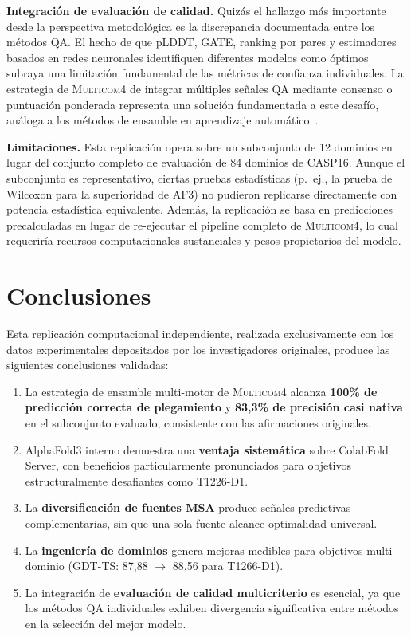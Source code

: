 \documentclass[10pt,twocolumn,a4paper]{article}
\newcommand{\gdtts}{\textsc{GDT-TS}}
\newcommand{\afthree}{AlphaFold3}
\newcommand{\multicom}{\textsc{Multicom4}}
\begin{document}
\textbf{Integración de evaluación de calidad.} Quizás el hallazgo más importante desde la perspectiva metodológica es la discrepancia documentada entre los métodos QA. El hecho de que pLDDT, GATE, ranking por pares y estimadores basados en redes neuronales identifiquen diferentes modelos como óptimos subraya una limitación fundamental de las métricas de confianza individuales. La estrategia de \multicom{} de integrar múltiples señales QA mediante consenso o puntuación ponderada representa una solución fundamentada a este desafío, análoga a los métodos de ensamble en aprendizaje automático~\cite{dietterich2000ensemble}.

\textbf{Limitaciones.} Esta replicación opera sobre un subconjunto de 12 dominios en lugar del conjunto completo de evaluación de 84 dominios de CASP16. Aunque el subconjunto es representativo, ciertas pruebas estadísticas (p.~ej., la prueba de Wilcoxon para la superioridad de AF3) no pudieron replicarse directamente con potencia estadística equivalente. Además, la replicación se basa en predicciones precalculadas en lugar de re-ejecutar el pipeline completo de \multicom{}, lo cual requeriría recursos computacionales sustanciales y pesos propietarios del modelo.


\section{Conclusiones}

Esta replicación computacional independiente, realizada exclusivamente con los datos experimentales depositados por los investigadores originales, produce las siguientes conclusiones validadas:

\begin{enumerate}
    \item La estrategia de ensamble multi-motor de \multicom{} alcanza \textbf{100\% de predicción correcta de plegamiento} y \textbf{83,3\% de precisión casi nativa} en el subconjunto evaluado, consistente con las afirmaciones originales.
    \item \afthree{} interno demuestra una \textbf{ventaja sistemática} sobre ColabFold Server, con beneficios particularmente pronunciados para objetivos estructuralmente desafiantes como T1226-D1.
    \item La \textbf{diversificación de fuentes MSA} produce señales predictivas complementarias, sin que una sola fuente alcance optimalidad universal.
    \item La \textbf{ingeniería de dominios} genera mejoras medibles para objetivos multi-dominio (\gdtts{}: 87,88 $\rightarrow$ 88,56 para T1266-D1).
    \item La integración de \textbf{evaluación de calidad multicriterio} es esencial, ya que los métodos QA individuales exhiben divergencia significativa entre métodos en la selección del mejor modelo.
\end{enumerate}
\end{document}
